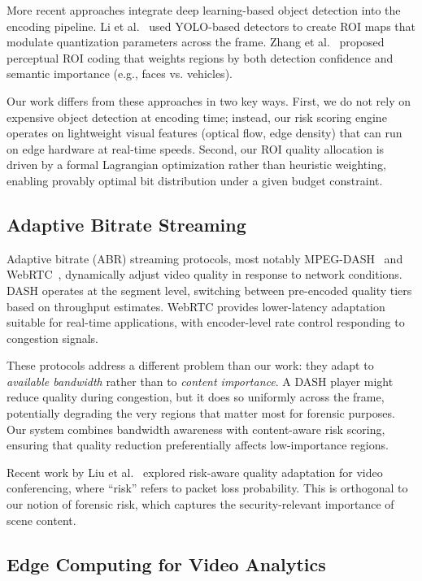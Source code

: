 More recent approaches integrate deep learning-based object detection into the encoding pipeline. Li et al.~\cite{li2021deep} used YOLO-based detectors to create ROI maps that modulate quantization parameters across the frame. Zhang et al.~\cite{zhang2022perceptual} proposed perceptual ROI coding that weights regions by both detection confidence and semantic importance (e.g., faces vs. vehicles).

Our work differs from these approaches in two key ways. First, we do not rely on expensive object detection at encoding time; instead, our risk scoring engine operates on lightweight visual features (optical flow, edge density) that can run on edge hardware at real-time speeds. Second, our ROI quality allocation is driven by a formal Lagrangian optimization rather than heuristic weighting, enabling provably optimal bit distribution under a given budget constraint.

\subsection{Adaptive Bitrate Streaming}

Adaptive bitrate (ABR) streaming protocols, most notably MPEG-DASH~\cite{stockhammer2011dash} and WebRTC~\cite{hutton2019webrtc}, dynamically adjust video quality in response to network conditions. DASH operates at the segment level, switching between pre-encoded quality tiers based on throughput estimates. WebRTC provides lower-latency adaptation suitable for real-time applications, with encoder-level rate control responding to congestion signals.

These protocols address a different problem than our work: they adapt to \emph{available bandwidth} rather than to \emph{content importance}. A DASH player might reduce quality during congestion, but it does so uniformly across the frame, potentially degrading the very regions that matter most for forensic purposes. Our system combines bandwidth awareness with content-aware risk scoring, ensuring that quality reduction preferentially affects low-importance regions.

Recent work by Liu et al.~\cite{liu2023risk} explored risk-aware quality adaptation for video conferencing, where ``risk'' refers to packet loss probability. This is orthogonal to our notion of forensic risk, which captures the security-relevant importance of scene content.

\subsection{Edge Computing for Video Analytics}

